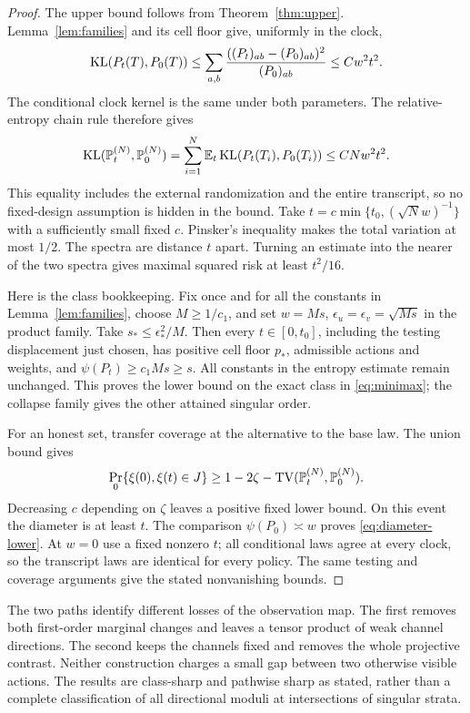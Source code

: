 \begin{proof}
The upper bound follows from Theorem~\ref{thm:upper}.
Lemma~\ref{lem:families} and its cell floor give, uniformly in the
clock,
\[
 \operatorname{KL}(P_t(T),P_0(T))
 \le\sum_{a,b}\frac{((P_t)_{ab}-(P_0)_{ab})^2}{(P_0)_{ab}}
 \le Cw^2t^2.
\]
The conditional clock kernel is the same under both parameters.
The relative-entropy chain rule therefore gives
\[
 \operatorname{KL}(\mathbb P_t^{(N)},\mathbb P_0^{(N)})
   =\sum_{i=1}^N\mathbb E_t\operatorname{KL}(P_t(T_i),P_0(T_i))\le CNw^2t^2.
\]
This equality includes the external randomization and the entire
transcript, so no fixed-design assumption is hidden in the bound.
Take $t=c\min\{t_0,(\sqrt Nw)^{-1}\}$ with a sufficiently small
fixed $c$. Pinsker's inequality makes the total variation at most
$1/2$. The spectra are distance $t$ apart. Turning an estimate into
the nearer of the two spectra gives maximal squared risk at least
$t^2/16$.

Here is the class bookkeeping. Fix once and for all the constants in
Lemma~\ref{lem:families}, choose $M\ge1/c_1$, and set
$w=Ms$, $\epsilon_u=\epsilon_v=\sqrt{Ms}$ in the product family.
Take $s_*\le\epsilon_*^2/M$. Then every $t\in[0,t_0]$, including
the testing displacement just chosen, has positive cell floor $p_*$,
admissible actions and weights, and $\psi(P_t)\ge c_1Ms\ge s$.
All constants in the entropy estimate remain unchanged. This proves
the lower bound on the exact class in \eqref{eq:minimax}; the collapse
family gives the other attained singular order.

For an honest set, transfer coverage at the alternative to the base
law. The union bound gives
\[
 \Pr_0\{\xi(0),\xi(t)\in J\}
       \ge1-2\zeta-\operatorname{TV}(\mathbb P_t^{(N)},\mathbb P_0^{(N)}).
\]
Decreasing $c$ depending on $\zeta$ leaves a positive fixed lower
bound. On this event the diameter is at least $t$.
The comparison $\psi(P_0)\asymp w$ proves
\eqref{eq:diameter-lower}. At $w=0$ use a fixed nonzero $t$;
all conditional laws agree at every clock, so the transcript laws are
identical for every policy. The same testing and coverage arguments
give the stated nonvanishing bounds.
\end{proof}

The two paths identify different losses of the observation map. The
first removes both first-order marginal changes and leaves a tensor
product of weak channel directions. The second keeps the channels
fixed and removes the whole projective contrast. Neither construction
charges a small gap between two otherwise visible actions. The results
are class-sharp and pathwise sharp as stated, rather than a complete
classification of all directional moduli at intersections of singular
strata.
